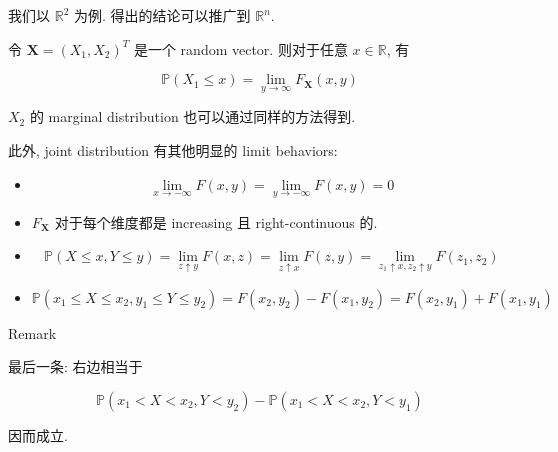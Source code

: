 我们以 \(\mathbb{R}^{2}\) 为例. 得出的结论可以推广到 \(\mathbb{R}^{\mathit{n}}\).

\begin{proposition}{}

令 \(\mathbf{X} = (\mathit{X}_{1},\mathit{X}_{2})^{\mathit{T}}\) 是一个 random vector. 则对于任意 \(\mathit{x} \in \mathbb{R}\), 有

\[\mathbb{P}(\mathit{X}_{1} \leq \mathit{x}) = \lim\limits_{\mathit{y}\rightarrow\infty}\mathit{F}_{\mathbf{X}}(\mathit{x},\mathit{y})\]

\(\mathit{X}_{2}\) 的 marginal distribution 也可以通过同样的方法得到.

此外, joint distribution 有其他明显的 limit behaviors:

\begin{itemize}
\item
  \[\lim\limits_{\mathit{x}\rightarrow - \infty}\mathit{F}(\mathit{x},\mathit{y}) = \lim\limits_{\mathit{y}\rightarrow - \infty}\mathit{F}(\mathit{x},\mathit{y}) = 0\]
\item
  \(\mathit{F}_{\mathbf{X}}\) 对于每个维度都是 increasing 且 right-continuous 的.
\item
  \[\mathbb{P}(\mathit{X} \leq \mathit{x},\mathit{Y} \leq \mathit{y}) = \lim\limits_{\mathit{z} \uparrow \mathit{y}}\mathit{F}(\mathit{x},\mathit{z}) = \lim\limits_{\mathit{z} \uparrow \mathit{x}}\mathit{F}(\mathit{z},\mathit{y}) = \lim\limits_{\mathit{z}_{1} \uparrow \mathit{x},\mathit{z}_{2} \uparrow \mathit{y}}\mathit{F}(\mathit{z}_{1},\mathit{z}_{2})\]
\item
  \[\mathbb{P}(\mathit{x}_{1} \leq \mathit{X} \leq \mathit{x}_{2},\mathit{y}_{1} \leq \mathit{Y} \leq \mathit{y}_{2}) = \mathit{F}(\mathit{x}_{2},\mathit{y}_{2}) - \mathit{F}(\mathit{x}_{1},\mathit{y}_{2}) = \mathit{F}(\mathit{x}_{2},\mathit{y}_{1}) + \mathit{F}(\mathit{x}_{1},\mathit{y}_{1})\]
\end{itemize}

\end{proposition}

\begin{qlremark}{Remark}

最后一条: 右边相当于

\[\mathbb{P}(\mathit{x}_{1} < \mathit{X} < \mathit{x}_{2},\mathit{Y} < \mathit{y}_{2}) - \mathbb{P}(\mathit{x}_{1} < \mathit{X} < \mathit{x}_{2},\mathit{Y} < \mathit{y}_{1})\]

因而成立.

\end{qlremark}

